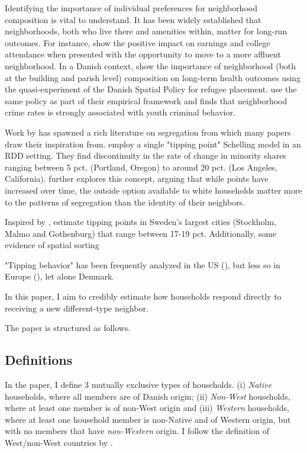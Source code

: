 \documentclass[../main.tex]{subfiles}
\begin{document}
Identifying the importance of individual preferences for neighborhood composition is vital to understand. It has been widely established that neighborhoods, both who live there and amenities within, matter for long-run outcomes. For instance, \textcite{chetty2016effects} show the positive impact on earnings and college attendance when presented with the opportunity to move to a more affluent neighborhood. In a Danish context, \textcite{hasager2024sick_poor_neighborhood} show the importance of neighborhood (both at the building and parish level) composition on long-term health outcomes using the quasi-experiment of the Danish Spatial Policy for refugee placement. \textcite{damm2014crime} use the same policy as part of their empirical framework and finds that neighborhood crime rates is strongly associated with youth criminal behavior.  

Work by \textcite{schelling1971dynamic} has spawned a rich literature on segregation from which many papers draw their inspiration from.  \textcite{card2008tipping} employ a single "tipping point" Schelling model in an RDD setting. They find discontinuity in the rate of change in minority shares ranging between 5 pct. (Portland, Oregon) to around 20 pct. (Los Angeles, California). \textcite{blair2017outside} further explores this concept, arguing that while points have increased over time, the outside option available to white households matter more to the patterns of segregation than the identity of their neighbors.

Inspired by \textcite{card2008tipping}, \textcite{bohlmark_willen_2020_tipping} estimate tipping points in Sweden's largest cities (Stockholm, Malmo and Gothenburg) that range between 17-19 pct. Additionally, some evidence of spatial sorting \textcite{}


"Tipping behavior" has been frequently analyzed in the US (\textcite{Ananat_2011, davis2018long, chetty2015impacts}), but less so in Europe (\textcite{bohlmark_willen_2020_tipping}), let alone Denmark. 

In this paper, I aim to credibly estimate how households respond directly to receiving a new different-type neighbor.


The paper is structured as follows. 

\subsection{Definitions}
\label{sec:intro_definitions}
In the paper, I define 3 mutually exclusive types of households. (i) \textit{Native} households, where all members are of Danish origin; (ii) \textit{Non-West} households, where at least one member is of non-West origin and (iii) \textit{Western} households, where at least one household member is non-Native and of Western origin, but with no members that have \textit{non-Western} origin. I follow the definition of West/non-West countries by \textcite{west_non_west_def_dst}.
\end{document}
